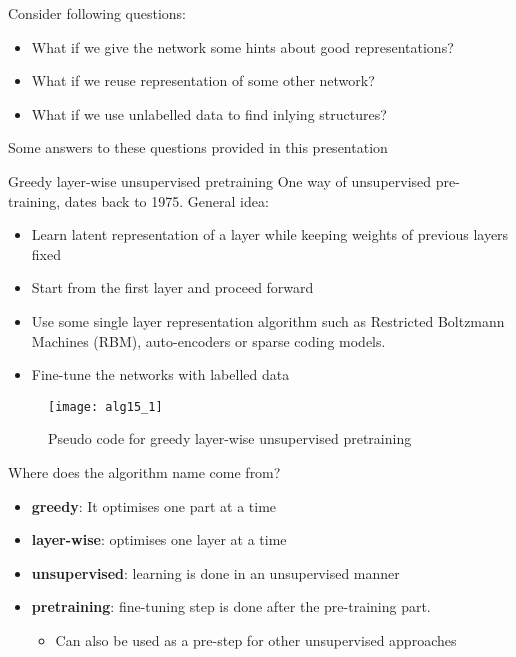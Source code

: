 \begin{frame}
Consider following questions:
\begin{itemize}
\item What if we give the network some hints about good representations?
\item What if we reuse representation of some other network?
\item What if we use unlabelled data to find inlying structures?
\end{itemize}
Some answers to these questions provided in this presentation
\end{frame}

\begin{frame}{Greedy layer-wise unsupervised pretraining}
One way of unsupervised pre-training, dates back to 1975. General idea:
\begin{itemize}
\item Learn latent representation of a layer while keeping weights of previous layers fixed
\item Start from the first layer and proceed forward
\item Use some single layer representation algorithm such as Restricted Boltzmann Machines (RBM), auto-encoders or sparse coding models.
\item Fine-tune the networks with labelled data
\end{itemize}
\end{frame}

\begin{frame}
\begin{figure}[t]
\centering
\texttt{[image: alg15\_1]} %
\caption{Pseudo code for greedy layer-wise unsupervised pretraining}
\end{figure}
\end{frame}

\begin{frame}
Where does the algorithm name come from?
\begin{itemize}
\item{\bf greedy}: It optimises one part at a time
\item{\bf layer-wise}: optimises one layer at a time
\item{\bf unsupervised}: learning is done in an unsupervised manner
\item{\bf pretraining}: fine-tuning step is done after the pre-training part. 
\begin{itemize}
\item Can also be used as a pre-step for other unsupervised approaches 
\end{itemize}
\end{itemize}
\end{frame}

